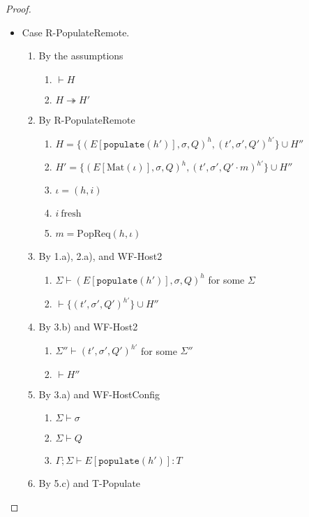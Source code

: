 \documentclass{article}
\theoremstyle{definition}
\newcommand{\PopReq}[2]{\text{PopReq}(#1, #2)}
\begin{document}
\begin{proof}
\begin{itemize}
\item Case R-PopulateRemote.
\begin{enumerate}
\item By the assumptions
  \begin{enumerate}[label=(\alph*)]
  \item $\vdash H$
  \item $H \twoheadrightarrow H'$
  \end{enumerate}
\item By R-PopulateRemote
  \begin{enumerate}[label=(\alph*)]
  \item $H = \{ (E[\texttt{populate}(h')], \sigma, Q)^h, (t', \sigma', Q')^{h'} \} \cup H''$
  \item $H' = \{ (E[\text{Mat}(\iota)], \sigma, Q)^h, (t', \sigma', Q' \cdot m)^{h'} \} \cup H''$
  \item $\iota     = (h, i)$
  \item $i~\text{fresh}$
  \item $m = {\PopReq h \iota}$
  \end{enumerate}
\item By 1.a), 2.a), and WF-Host2
  \begin{enumerate}[label=(\alph*)]
  \item $\Sigma \vdash (E[\texttt{populate}(h')], \sigma, Q)^h$ for some $\Sigma$
  \item $\vdash \{ (t', \sigma', Q')^{h'} \} \cup H''$
  \end{enumerate}
\item By 3.b) and WF-Host2
  \begin{enumerate}[label=(\alph*)]
  \item $\Sigma'' \vdash (t', \sigma', Q')^{h'}$ for some $\Sigma''$
  \item $\vdash H''$
  \end{enumerate}
\item By 3.a) and WF-HostConfig
  \begin{enumerate}[label=(\alph*)]
  \item $\Sigma \vdash \sigma$
  \item $\Sigma \vdash Q$
  \item $\Gamma ; \Sigma \vdash E[\texttt{populate}(h')] : T$
  \end{enumerate}
\item By 5.c) and T-Populate
  \begin{enumerate}[label=(\alph*)]

\end{enumerate}
\end{enumerate}
\end{itemize}
\end{proof}
\end{document}
